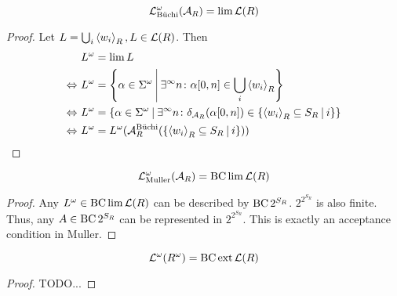\begin{lemma}
\label{gen:lang_omega_buechi}
\[ \mathcal{L}^\omega_{\text{Büchi}}(\mathcal{A}_R) = \lim \mathcal{L}(R) \]
\begin{proof}
Let $L = \bigcup_i \left< w_i\right>_R, L \in \mathcal{L}(R)$. Then
\begin{align*}
& L^\omega = \lim L \\
\Leftrightarrow \ & L^\omega = \Set{\alpha \in \Sigma^\omega}{\exists^\infty n \colon \alpha[0,n] \in \bigcup_i \left< w_i\right>_R} \\
\Leftrightarrow \ & L^\omega = \Set{\alpha \in \Sigma^\omega}{\exists^\infty n \colon \delta_{\A_R}(\alpha[0,n]) \in \Set{\left< w_i\right>_R \subseteq S_R}{i}} \\
\Leftrightarrow \ & L^\omega = L^\omega(\A^{\text{Büchi}}_R(\Set{\left< w_i\right>_R \subseteq S_R}{i}))
\end{align*}
\end{proof}
\end{lemma}

\begin{lemma}
\label{gen:lang_omega_muller}
\[ \mathcal{L}^\omega_{\text{Muller}}(\mathcal{A}_R) = \operatorname{BC} \lim \mathcal{L}(R) \]
\begin{proof}
Any $L^\omega \in \operatorname{BC} \lim \mathcal{L}(R)$ can be described by $\operatorname{BC} 2^{S_R}$. $2^{2^{S_R}}$ is also finite. Thus, any $A \in \operatorname{BC} 2^{S_R}$ can be represented in $2^{2^{S_R}}$. This is exactly an acceptance condition in Muller.
\end{proof}
\end{lemma}

\begin{lemma}
\[ \mathcal{L}^\omega(R^\omega) = \operatorname{BC} \operatorname{ext} \mathcal{L}(R) \]
\begin{proof}
TODO...
\end{proof}
\end{lemma}

